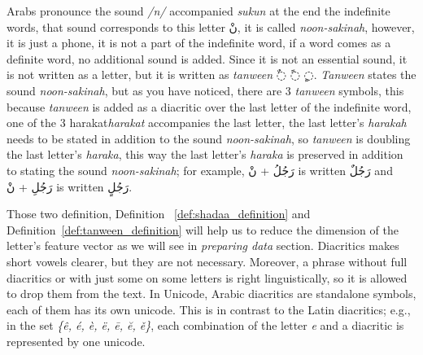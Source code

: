 Arabs pronounce the sound \textit{/n/} accompanied \textit{sukun} at the end the indefinite words,
that sound corresponds to this letter \textarabic{نْ}, it is called \textit{noon-sakinah}, however,
it is just a phone, it is not a part of the indefinite word, if a word comes as a definite word, no
additional sound is added. Since it is not an essential sound, it is not written as a letter, but it
is written as \textit{tanween} \textarabic{◌ٌ ◌ً ◌ٍ}.
\textit{Tanween} states the sound \textit{noon-sakinah}, but as you have noticed,
there are 3 \textit{tanween} symbols, this because  \textit{tanween} is added as
a diacritic over the last letter of the indefinite word, one of the 3 harakat\textit{harakat} accompanies the last letter, the last letter's \textit{harakah}
needs to be stated in addition to the sound \textit{noon-sakinah}, so
\textit{tanween} is doubling the last letter's \textit{haraka}, this way the last
letter's \textit{haraka} is preserved in addition to stating the sound
\textit{noon-sakinah}; for example, \textarabic{رَجُلُ + نْ} is written
\textarabic{رَجُلٌ} and  \textarabic{رَجُلِ + نْ} is written \textarabic{رَجُلٍ}.

Those two definition, Definition ~\ref{def:shadaa_definition} and
Definition~\ref{def:tanween_definition} will help us to reduce the dimension of the letter's feature
vector as we will see in \textit{preparing data} section.%
Diacritics makes short vowels clearer, but they are not necessary.  Moreover, a phrase without full
diacritics or with just some on some letters is right linguistically, so it is allowed to drop them
from the text. In Unicode, Arabic diacritics are standalone symbols, each of them has its own
unicode. This is in contrast to the Latin diacritics; e.g., in the set \textit{\{ê, é, è, ë, ē, ĕ,
  ě\}}, each combination of the letter \textit{e} and a diacritic is represented by one unicode.


